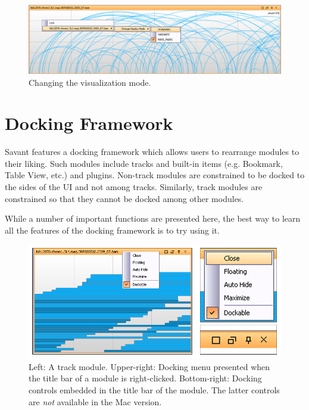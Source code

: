 \documentclass{report}
\begin{document}
\begin{figure}[!h]
\begin{center}
\includegraphics[type=png,ext=.png,read=.png,width=16cm]{images/changevizmode}
\caption{Changing the visualization mode.}
\label{changevizmode}
\end{center}
\end{figure}

\chapter{Docking Framework}

Savant features a docking framework which allows users to rearrange modules to their liking. Such modules include tracks and built-in items (e.g. Bookmark, Table View, etc.) and plugins. Non-track modules are constrained to be docked to the sides of the UI and not among tracks. Similarly, track modules are constrained so that they cannot be docked among other modules.

While a number of important functions are presented here, the best way to learn all the features of the docking framework is to try using it.

\begin{figure}[!h]
\begin{center}
\includegraphics[type=png,ext=.png,read=.png,width=12cm]{images/dockingcontrols}
\caption{Left: A track module. Upper-right: Docking menu presented when the title bar of a module is right-clicked. Bottom-right: Docking controls embedded in the title bar of the module. The latter controls are {\it not} available in the Mac version.}
\end{center}
\end{figure}
\end{document}
